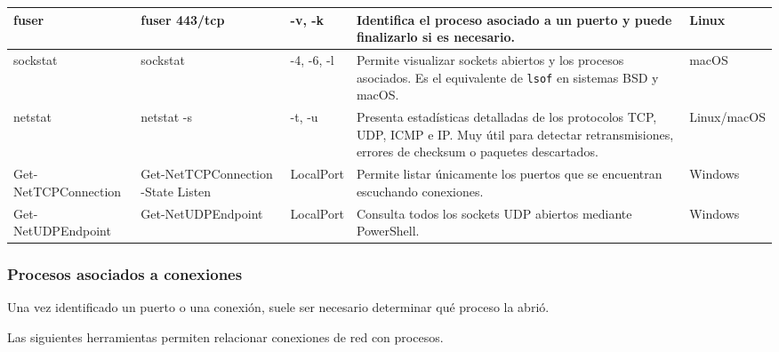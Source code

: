 \documentclass[a4paper,10pt]{article}
\begin{document}
\begin{longtable}{|p{2.8cm}|p{3cm}|p{4cm}|p{5.6cm}|p{1.5cm}|}
fuser &
fuser 443/tcp &
-v, -k &
Identifica el proceso asociado a un puerto y puede finalizarlo si es necesario. &
Linux
\\
\hline


\hline

sockstat &
sockstat &
-4, -6, -l &
Permite visualizar sockets abiertos y los procesos asociados. Es el equivalente de \texttt{lsof} en sistemas BSD y macOS. &
macOS
\\
\hline

netstat &
netstat -s &
-t, -u &
Presenta estadísticas detalladas de los protocolos TCP, UDP, ICMP e IP. Muy útil para detectar retransmisiones, errores de checksum o paquetes descartados. &
Linux/macOS
\\
\hline

Get-NetTCPConnection &
Get-NetTCPConnection -State Listen &
LocalPort &
Permite listar únicamente los puertos que se encuentran escuchando conexiones. &
Windows
\\
\hline

Get-NetUDPEndpoint &
Get-NetUDPEndpoint &
LocalPort &
Consulta todos los sockets UDP abiertos mediante PowerShell. &
Windows
\\
\hline

\end{longtable}


\subsubsection{Procesos asociados a conexiones}

Una vez identificado un puerto o una conexión, suele ser necesario determinar
qué proceso la abrió.

Las siguientes herramientas permiten relacionar conexiones de red con procesos.
\end{document}
